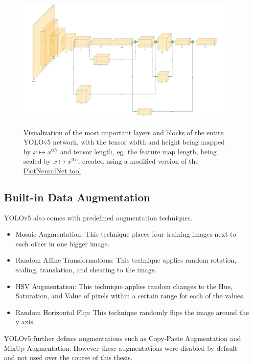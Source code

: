 \documentclass[10pt]{book}
\begin{document}
\begin{figure}
  \caption{Visualization of the most important layers and blocks of the entire \ac{YOLO}v5 network, with the tensor width and height being mapped by $x \mapsto x^{0.7}$ and tensor length, eg. the feature map length, being scaled by $x \mapsto x^{0.5}$, created using a modified version of the \href{https://github.com/jnccd/PlotNeuralNet}{PlotNeuralNet tool} \cite{haris_iqbal_2018_2526396}}
  \includegraphics[width=\textwidth]{image/yolov5}
  \label{fig:yolov5}
\end{figure}

\subsection{Built-in Data Augmentation}

\ac{YOLO}v5 also comes with predefined augmentation techniques. 

\begin{itemize}
  \item Mosaic Augmentation: This technique places four training images next to each other in one bigger image.
  \item Random Affine Transformations: This technique applies random rotation, scaling, translation, and shearing to the image.
  \item HSV Augmentation: This technique applies random changes to the Hue, Saturation, and Value of pixels within a certain range for each of the values.
  \item Random Horizontal Flip: This technique randomly flips the image around the y axis.
\end{itemize}

\ac{YOLO}v5 further defines augmentations such as Copy-Paste Augmentation and MixUp Augmentation. However these augmentations were disabled by default and not used over the course of this thesis.
\end{document}
